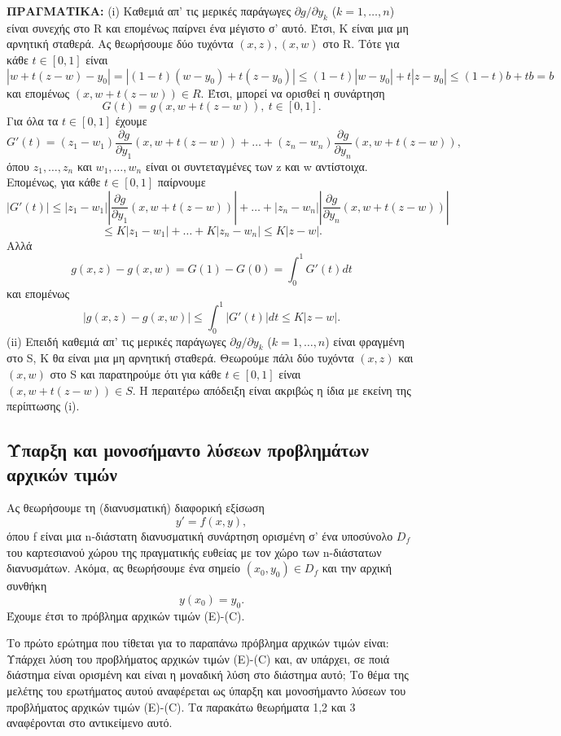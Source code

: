 \documentclass[11pt,a4paper,twoside]{book}
\begin{document}
\textbf{ΠΡΑΓΜΑΤΙΚΑ:} (i) Καθεμιά απ' τις μερικές παράγωγες $\partial g / \partial y_k$ ($k=1,\dots,n$) είναι συνεχής στο R και επομένως παίρνει ένα μέγιστο σ' αυτό. Έτσι, Κ είναι μια μη αρνητική σταθερά. Ας θεωρήσουμε δύο τυχόντα $(x,z), (x,w)$ στο R. Τότε για κάθε $t \in [0,1]$ είναι
\[
|w+t(z-w)-y_0| = |(1-t)(w-y_0)+t(z-y_0)| \le (1-t)|w-y_0|+t|z-y_0| \le (1-t)b+tb=b
\]
και επομένως $(x,w+t(z-w)) \in R$. Έτσι, μπορεί να ορισθεί η συνάρτηση
\[
G(t) = g(x, w+t(z-w)), \ t \in [0,1].
\]
Για όλα τα $t \in [0,1]$ έχουμε
\[
G'(t) = (z_1-w_1)\frac{\partial g}{\partial y_1}(x,w+t(z-w)) + \dots + (z_n-w_n)\frac{\partial g}{\partial y_n}(x,w+t(z-w)),
\]
όπου $z_1,\dots,z_n$ και $w_1,\dots,w_n$ είναι οι συντεταγμένες των z και w αντίστοιχα. Επομένως, για κάθε $t \in [0,1]$ παίρνουμε
\[
|G'(t)| \le |z_1-w_1|\left|\frac{\partial g}{\partial y_1}(x,w+t(z-w))\right| + \dots + |z_n-w_n|\left|\frac{\partial g}{\partial y_n}(x,w+t(z-w))\right|
\]
\[
\le K|z_1-w_1| + \dots + K|z_n-w_n| \le K|z-w|.
\]
Αλλά \[
g(x,z) - g(x,w) = G(1) - G(0) = \int_0^1 G'(t)dt
\]
και επομένως
\[
|g(x,z)-g(x,w)| \le \int_0^1 |G'(t)|dt \le K|z-w|.
\]
(ii) Επειδή καθεμιά απ' τις μερικές παράγωγες $\partial g / \partial y_k$ ($k=1,\dots,n$) είναι φραγμένη στο S, Κ θα είναι μια μη αρνητική σταθερά. Θεωρούμε πάλι δύο τυχόντα $(x,z)$ και $(x,w)$ στο S και παρατηρούμε ότι για κάθε $t \in [0,1]$ είναι $(x,w+t(z-w)) \in S$. Η περαιτέρω απόδειξη είναι ακριβώς η ίδια με εκείνη της περίπτωσης (i).

\subsection{Ύπαρξη και μονοσήμαντο λύσεων προβλημάτων αρχικών τιμών}
Ας θεωρήσουμε τη (διανυσματική) διαφορική εξίσωση
\begin{equation}
y' = f(x,y), \tag{E}
\end{equation}
όπου f είναι μια n-διάστατη διανυσματική συνάρτηση ορισμένη σ' ένα υποσύνολο $D_f$ του καρτεσιανού χώρου της πραγματικής ευθείας με τον χώρο των n-διάστατων διανυσμάτων. Ακόμα, ας θεωρήσουμε ένα σημείο $(x_0,y_0) \in D_f$ και την αρχική συνθήκη
\begin{equation}
y(x_0)=y_0. \tag{C}
\end{equation}
Έχουμε έτσι το πρόβλημα αρχικών τιμών (E)-(C).

Το πρώτο ερώτημα που τίθεται για το παραπάνω πρόβλημα αρχικών τιμών είναι: Υπάρχει λύση του προβλήματος αρχικών τιμών (E)-(C) και, αν υπάρχει, σε ποιά διάστημα είναι ορισμένη και είναι η μοναδική λύση στο διάστημα αυτό; Το θέμα της μελέτης του ερωτήματος αυτού αναφέρεται ως ύπαρξη και μονοσήμαντο λύσεων του προβλήματος αρχικών τιμών (E)-(C). Τα παρακάτω θεωρήματα 1,2 και 3 αναφέρονται στο αντικείμενο αυτό.
\end{document}
